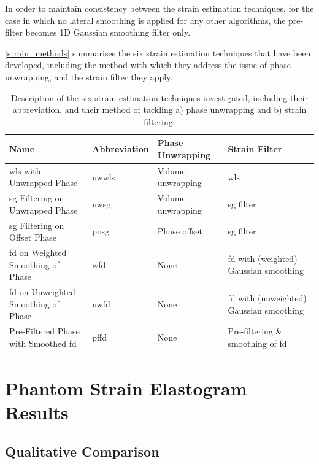 In order to maintain consistency between the strain estimation techniques, for the case in which no lateral smoothing is applied for any other algorithms, the pre-filter becomes 1D Gaussian smoothing filter only.

\autoref{strain_methods} summarises the six strain estimation techniques that have been developed, including the method with which they address the issue of phase unwrapping, and the strain filter they apply.

\begin{table}[h]
	\centering
	\begin{tabularx}{\textwidth}{YlYY}
		\toprule
		Name & Abbreviation & Phase Unwrapping & Strain Filter \\
		\midrule
		\ac{wls} with Unwrapped Phase & \ac{uwwls} & Volume unwrapping & \ac{wls} \\
		\ac{sg} Filtering on Unwrapped Phase & \ac{uwsg} & Volume unwrapping & \ac{sg} filter \\
		\ac{sg} Filtering on Offset Phase & \ac{posg} & Phase offset & \ac{sg} filter \\
		\ac{fd} on Weighted Smoothing of Phase & \ac{wfd} & None & \ac{fd} with (weighted) Gaussian smoothing \\
		\ac{fd} on Unweighted Smoothing of Phase & \ac{uwfd} & None & \ac{fd} with (unweighted) Gaussian smoothing \\
		Pre-Filtered Phase with Smoothed \ac{fd} & \ac{pffd} & None & Pre-filtering \& smoothing of \ac{fd} \\
		\bottomrule
	\end{tabularx}
	\caption{Description of the six strain estimation techniques investigated, including their abbreviation, and their method of tackling a) phase unwrapping and b) strain filtering.}
	\label{strain_methods}
\end{table}

\section{Phantom Strain Elastogram Results}\label{phantom_results}

\subsection{Qualitative Comparison}\label{qualitative1}

